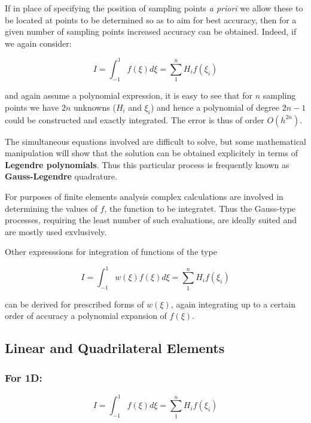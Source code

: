 \documentclass[10pt,b5paper,titlepage]{book}
\begin{document}
If in place of specifying the position of sampling points \textit{a priori} we
allow these to be located at points to be determined so as to aim for best
accuracy, then for a given number of sampling points increased accuracy can be
obtained. Indeed, if we again consider:

\begin{equation}
    I = \int_{-1}^{1} f(\xi) d\xi = \sum_1^n H_i f(\xi_i)
\end{equation}

and again assume a polynomial expression, it is easy to see that for $ n $ sampling
points we have $ 2n $ unknowns ($H_i$ and $\xi_i$) and hence a polynomial of degree
$ 2n-1 $ could be constructed and exactly integrated. The error is thus of order
$ O(h^{2n}) $.

The simultaneous equations involved are difficult to solve, but some mathematical
manipulation will show that the solution can be obtained explicitely in terms
of \textbf{Legendre polynomials}. Thus this particular process is frequently known
as \textbf{Gauss-Legendre} quadrature.

For purposes of finite elements analysis complex calculations are involved in
determining the values of $ f $, the function to be integratet. Thus the
Gauss-type processes, requiring the least number of such evaluations, are ideally
suited and are mostly used exvlusively.

Other expresssions for integration of functions of the type

\begin{equation}\label{leggaus}
    I = \int_{-1}^{1} w(\xi) f(\xi) d\xi = \sum_{1}^{n} H_i f(\xi_i)
\end{equation}

can be derived for prescribed forms of $ w(\xi) $, again integrating up to a certain
order of accuracy a polynomial expansion of $ f(\xi) $.


\subsection{Linear and Quadrilateral Elements}

\subsubsection{For 1D:}

\begin{equation}
    I = \int_{-1}^{1} f(\xi) d\xi = \sum_1^n H_i f(\xi_i)
\end{equation}
\end{document}
